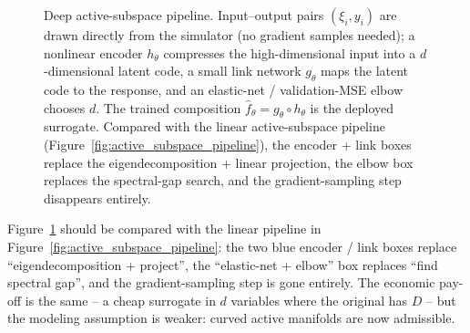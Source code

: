 \documentclass[11pt,a4paper]{report}
\begin{document}
\begin{figure}[ht]
\centering
{}
\caption{Deep active-subspace pipeline.  Input--output pairs $(\xi_i, y_i)$ are drawn directly from the simulator (no gradient samples needed); a nonlinear encoder $h_\theta$ compresses the high-dimensional input into a $d$-dimensional latent code, a small link network $g_\theta$ maps the latent code to the response, and an elastic-net / validation-MSE elbow chooses $d$.  The trained composition $\hat f_\theta = g_\theta \circ h_\theta$ is the deployed surrogate.  Compared with the linear active-subspace pipeline (Figure~\ref{fig:active_subspace_pipeline}), the encoder + link boxes replace the eigendecomposition + linear projection, the elbow box replaces the spectral-gap search, and the gradient-sampling step disappears entirely.}
\label{fig:deep_as_pipeline}
\end{figure}

Figure~\ref{fig:deep_as_pipeline} should be compared with the linear pipeline in Figure~\ref{fig:active_subspace_pipeline}: the two blue encoder / link boxes replace ``eigendecomposition + project'', the ``elastic-net + elbow'' box replaces ``find spectral gap'', and the gradient-sampling step is gone entirely.  The economic pay-off is the same -- a cheap surrogate in $d$ variables where the original has $D$ -- but the modeling assumption is weaker: curved active manifolds are now admissible.
\end{document}
